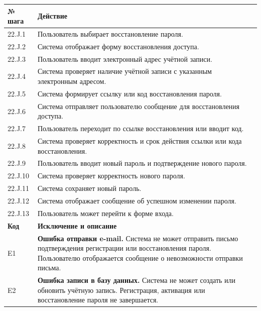\documentclass[12pt,a4paper]{article}
\begin{document}
\begin{xltabular}{\textwidth}{
			|>{\raggedright\arraybackslash}p{2.7cm}
			|>{\raggedright\arraybackslash}X|
		}
		
		\textbf{№ шага} & \textbf{Действие} \\
		\hline
		
		22.J.1 & Пользователь выбирает восстановление пароля. \\
		\hline
		22.J.2 & Система отображает форму восстановления доступа. \\
		\hline
		22.J.3 & Пользователь вводит электронный адрес учётной записи. \\
		\hline
		22.J.4 & Система проверяет наличие учётной записи с указанным электронным адресом. \\
		\hline
		22.J.5 & Система формирует ссылку или код восстановления пароля. \\
		\hline
		22.J.6 & Система отправляет пользователю сообщение для восстановления доступа. \\
		\hline
		22.J.7 & Пользователь переходит по ссылке восстановления или вводит код. \\
		\hline
		22.J.8 & Система проверяет корректность и срок действия ссылки или кода восстановления. \\
		\hline
		22.J.9 & Пользователь вводит новый пароль и подтверждение нового пароля. \\
		\hline
		22.J.10 & Система проверяет корректность нового пароля. \\
		\hline
		22.J.11 & Система сохраняет новый пароль. \\
		\hline
		22.J.12 & Система отображает сообщение об успешном изменении пароля. \\
		\hline
		22.J.13 & Пользователь может перейти к форме входа. \\
		\hline
		
		
		\textbf{Код} & \textbf{Исключение и описание} \\
		\hline
		
		E1 &
		\textbf{Ошибка отправки e-mail.}
		Система не может отправить письмо подтверждения регистрации или
		восстановления пароля. Пользователю отображается сообщение о
		невозможности отправки письма. \\
		\hline
		
		E2 &
		\textbf{Ошибка записи в базу данных.}
		Система не может создать или обновить учётную запись. Регистрация,
		активация или восстановление пароля не завершается. \\
		\hline
		

\end{xltabular}
\end{document}
